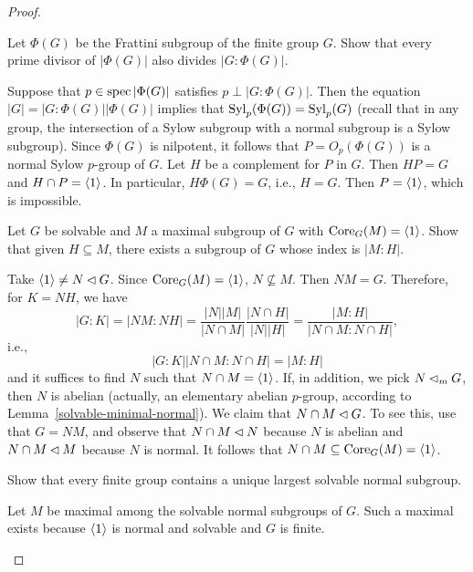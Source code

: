 \begin{proof}
\begin{probl}
    Let\/ $\Phi(G)$ be the Frattini subgroup of the finite group\/ $G$. Show that every prime divisor of\/ $|\Phi(G)|$ also divides\/ $|G:\Phi(G)|$.
\end{probl}

\begin{solution} Suppose that $p\in\operatorname{spec}|\Phi(G)|$ satisfies $p\perp|G:\Phi(G)|$. Then the equation $|G|=|G:\Phi(G)||\Phi(G)|$ implies that ${\rm Syl}_p(\Phi(G))={\rm Syl}_p(G)$ (recall that in any group, the intersection of a Sylow subgroup with a normal subgroup is a Sylow subgroup). Since $\Phi(G)$ is nilpotent, it follows that $P=O_p(\Phi(G))$ is a normal Sylow $p$-group of $G$. Let $H$ be a complement for $P$ in $G$. Then $HP=G$ and $H\cap P=\langle1\rangle$. In particular, $H\Phi(G)=G$, i.e., $H=G$. Then $P=\langle1\rangle$, which is impossible.  \end{solution}

\begin{probl}\label{problem-3.B.12}
    Let\/ $G$ be solvable and $M$ a maximal subgroup of\/ $G$ with ${\rm Core}_G(M)=\langle1\rangle$. Show that given\/ $H \subseteq M$, there exists a subgroup of\/ $G$ whose index is\/ $|M : H|$.
\end{probl}

\begin{solution} Take $\langle1\rangle\ne N\lhd G$. Since ${\rm Core}_G(M)=\langle1\rangle$, $N\not\subseteq M$. Then $NM=G$. Therefore, for $K=NH$, we have
$$
    |G:K|=|NM:NH|=\frac{|N||M|}{|N\cap M|}\frac{|N\cap H|}{|N||H|}
        =\frac{|M:H|}{|N\cap M:N\cap H|},
$$
i.e.,
$$
    |G:K||N\cap M:N\cap H|=|M:H|
$$
and it suffices to find $N$ such that $N\cap M=\langle1\rangle$. If, in addition, we pick $N\lhd_mG$, then $N$ is abelian (actually, an elementary abelian $p$-group, according to Lemma~\ref{solvable-minimal-normal}). We claim that $N\cap M\lhd G$. To see this, use that $G=NM$, and observe that $N\cap M\lhd N$ because $N$ is abelian and $N\cap M\lhd M$ because $N$ is normal. It follows that $N\cap M\subseteq{\rm Core}_G(M)=\langle1\rangle$.  \end{solution}


\begin{probl}
    Show that every finite group contains a unique largest solvable normal subgroup.
\end{probl}

\begin{solution} Let $M$ be maximal among the solvable normal subgroups of $G$. Such a maximal exists because $\langle1\rangle$ is normal and solvable and $G$ is finite.


\end{solution}
\end{proof}
